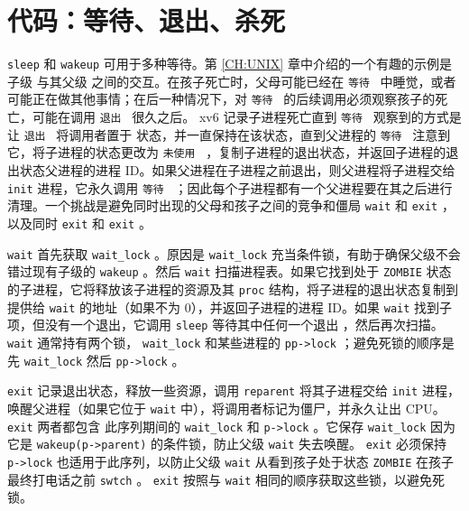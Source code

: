 \documentclass[UTF8]{article}
\begin{document}
{    \section{代码：等待、退出、杀死  }   
    \lstinline{sleep}    和
    \lstinline{wakeup}    可用于多种等待。第    \ref{CH:UNIX}    章中介绍的一个有趣的示例是子级        与其父级        之间的交互。在孩子死亡时，父母可能已经在  {    \tt    等待   }  中睡觉，或者可能正在做其他事情；在后一种情况下，对  {    \tt    等待   }  的后续调用必须观察孩子的死亡，可能在调用  {    \tt    退出   }  很久之后。 xv6 记录子进程死亡直到  {    \tt    等待   }  观察到的方式是让  {    \tt    退出   }  将调用者置于        状态，并一直保持在该状态，直到父进程的  {    \tt    等待   }  注意到它，将子进程的状态更改为  {    \tt    未使用   }  ，复制子进程的退出状态，并返回子进程的退出状态父进程的进程 ID。如果父进程在子进程之前退出，则父进程将子进程交给
    \lstinline{init}    进程，它永久调用  {    \tt    等待   }  ；因此每个子进程都有一个父进程要在其之后进行清理。一个挑战是避免同时出现的父母和孩子之间的竞争和僵局
    \lstinline{wait}    和
    \lstinline{exit}    ，以及同时
    \lstinline{exit}    和    \lstinline{exit}    。  

   \lstinline{wait}    首先获取
    \lstinline{wait_lock}   
        。原因是    \lstinline{wait_lock}    充当条件锁，有助于确保父级不会错过现有子级的    \lstinline{wakeup}   。然后   \lstinline{wait}   扫描进程表。如果它找到处于    \texttt{ZOMBIE}    状态的子进程，它将释放该子进程的资源及其    \lstinline{proc}    结构，将子进程的退出状态复制到提供给    \lstinline{wait}    的地址（如果不为 0），并返回子进程的进程 ID。如果
    \lstinline{wait}    找到子项，但没有一个退出，它调用
    \lstinline{sleep}    等待其中任何一个退出
        ，然后再次扫描。
    \lstinline{wait}   通常持有两个锁，
    \lstinline{wait_lock}    和某些进程的    \lstinline{pp->lock}    ；避免死锁的顺序是先    \lstinline{wait_lock}    然后    \lstinline{pp->lock}    。  

   \lstinline{exit}           记录退出状态，释放一些资源，调用    \lstinline{reparent}    将其子进程交给    \lstinline{init}    进程，唤醒父进程（如果它位于    \lstinline{wait}    中），将调用者标记为僵尸，并永久让出 CPU。    \lstinline{exit}    两者都包含
 此序列期间的    \lstinline{wait_lock}    和    \lstinline{p->lock}   。它保存    \lstinline{wait_lock}    因为它是    \lstinline{wakeup(p->parent)}    的条件锁，防止父级
    \lstinline{wait}    失去唤醒。    \lstinline{exit}    必须保持
    \lstinline{p->lock}    也适用于此序列，以防止父级
    \lstinline{wait}    从看到孩子处于状态
    \lstinline{ZOMBIE}    在孩子最终打电话之前
    \lstinline{swtch}    。    \lstinline{exit}    按照与    \lstinline{wait}    相同的顺序获取这些锁，以避免死锁。  

}
\end{document}
